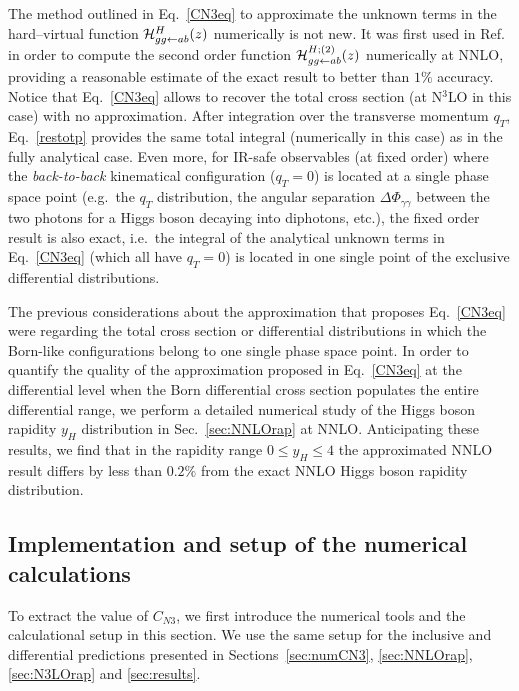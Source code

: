 \documentclass[12pt]{article}
\def\ito{\leftarrow}
\DeclareRobustCommand{\qt}{q_T}
\begin{document}
The method outlined in Eq.~\eqref{CN3eq} to approximate the unknown terms in the hard--virtual function ${\cal H}^H_{gg\ito ab}(z)$ numerically is not new. It was first used in Ref.~\cite{Bozzi:2005wk} in order to compute the second order function ${\cal H}^{H;(2)}_{gg\ito ab}(z)$ numerically at NNLO, providing a reasonable estimate of the exact result to better than $1\%$ accuracy. Notice that Eq.~\eqref{CN3eq} allows to recover the total cross section (at N$^{3}$LO in this case) with no approximation. After integration over the transverse momentum $\qt$, Eq.~\eqref{restotp} provides the same total integral (numerically in this case)  as in the fully analytical case. Even more, for IR-safe observables (at fixed order) where the \textit{back-to-back} kinematical configuration ($\qt=0$) is located at a single phase space point (e.g.\ the $\qt$ distribution, the angular separation $\Delta \Phi _{\gamma\gamma}$ between the two photons for a Higgs boson decaying into diphotons, etc.), the fixed order result is also exact, i.e.\ the integral of the analytical unknown terms in Eq.~\eqref{CN3eq} (which all have $\qt=0$) is located in one single point of the exclusive differential distributions. 

The previous considerations about the approximation that proposes Eq.~\eqref{CN3eq} were regarding the total cross section or differential distributions in which the Born-like configurations belong to one single phase space point.
In order to quantify the quality of the approximation proposed in Eq.~\eqref{CN3eq} at the differential level when the Born differential cross section populates the entire differential range, we perform a detailed numerical study of the Higgs boson rapidity $y_{H}$ distribution in Sec.~\ref{sec:NNLOrap} at NNLO. Anticipating these results,  we find that in the rapidity range $0\leq y_{H}\leq 4$ the approximated NNLO result differs by less than $0.2\%$ from the exact NNLO Higgs boson rapidity distribution.

\subsection{Implementation and setup of the numerical calculations}
\label{sec:numsetup}
To extract the value of $C_{N3}$, we first introduce the numerical tools and the calculational setup in this section. We use the same setup for the inclusive and differential predictions presented in Sections~\ref{sec:numCN3}, \ref{sec:NNLOrap}, \ref{sec:N3LOrap} and \ref{sec:results}.
\end{document}
